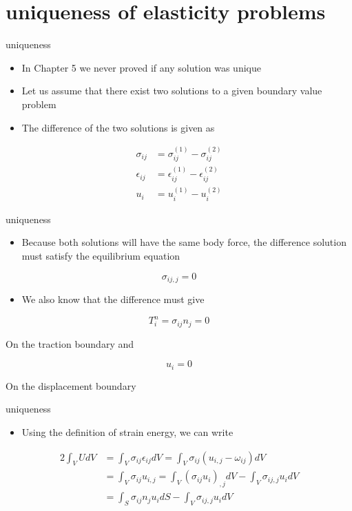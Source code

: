 \documentclass[
  letterpaper,
  ignorenonframetext,
  aspectratio=43,
  handout,
  12pt]{beamer}
\providecommand{\tightlist}{%
  \setlength{\itemsep}{0pt}\setlength{\parskip}{0pt}}
\providecommand{\tightlist}{%
\setlength{\itemsep}{0pt}\setlength{\parskip}{0pt}}
\begin{document}
\hypertarget{uniqueness-of-elasticity-problems}{%
\section{uniqueness of elasticity
problems}\label{uniqueness-of-elasticity-problems}}

\begin{frame}{uniqueness}
\protect\hypertarget{uniqueness}{}
\begin{itemize}
\tightlist
\item
  In Chapter 5 we never proved if any solution was unique
\item
  Let us assume that there exist two solutions to a given boundary value
  problem
\item
  The difference of the two solutions is given as
\end{itemize}

\[\begin{aligned}
    \sigma_{ij} &= \sigma_{ij}^{(1)} - \sigma_{ij}^{(2)}\\
    \epsilon_{ij} &= \epsilon_{ij}^{(1)} - \epsilon_{ij}^{(2)}\\
    u_i &= u_i^{(1)} - u_i^{(2)}
\end{aligned}\]
\end{frame}

\begin{frame}{uniqueness}
\protect\hypertarget{uniqueness-1}{}
\begin{itemize}
\tightlist
\item
  Because both solutions will have the same body force, the difference
  solution must satisfy the equilibrium equation
\end{itemize}

\[\sigma_{ij,j} = 0\]

\begin{itemize}
\tightlist
\item
  We also know that the difference must give
\end{itemize}

\[T_i^n = \sigma_{ij}n_j = 0\]

On the traction boundary and

\[u_i = 0\]

On the displacement boundary
\end{frame}

\begin{frame}{uniqueness}
\protect\hypertarget{uniqueness-2}{}
\begin{itemize}
\tightlist
\item
  Using the definition of strain energy, we can write
\end{itemize}

\[\begin{aligned}
    2 \int_V U dV &= \int_V \sigma_{ij} \epsilon_{ij} dV = \int_V \sigma_{ij}(u_{i,j}-\omega_{ij}) dV\\
    &= \int_V \sigma_{ij}u_{i,j} = \int_V (\sigma_{ij}u_i)_{,j} dV - \int_V \sigma_{ij,j}u_i dV\\
    &= \int_S \sigma_{ij}n_j u_i dS - \int_V \sigma_{ij,j}u_i dV
\end{aligned}\]
\end{frame}
\end{document}
